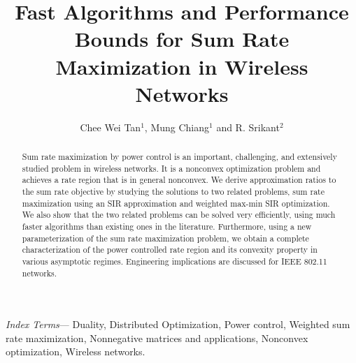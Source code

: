 \documentclass[10pt,twocolumn]{IEEEtran}
\newcommand{\0}{\mathbf{0}}
\newcommand{\1}{\mathbf{1}}
\begin{document}
\title{Fast Algorithms and Performance Bounds for Sum Rate Maximization in Wireless Networks}
\author{Chee Wei Tan$^1$, Mung Chiang$^1$ and R. Srikant$^2$\\
 }
\maketitle
\begin{abstract}
Sum rate maximization by power control is an important, challenging, and extensively studied problem in wireless networks. It is a nonconvex optimization problem and achieves a rate region that is in general nonconvex. We derive approximation ratios to the sum rate objective by studying the solutions to two related problems, sum rate maximization using an SIR approximation and weighted max-min SIR optimization. We also show that the two related problems can be solved very efficiently, using much faster algorithms than existing ones in the literature. Furthermore, using a new parameterization of the sum rate maximization problem, we obtain a complete characterization of the power controlled rate region and its convexity property in various asymptotic regimes. Engineering implications are discussed for IEEE 802.11 networks. 
\end{abstract}

{\small {\it Index Terms}--- Duality, Distributed Optimization, Power control, Weighted sum rate maximization, Nonnegative matrices and applications, Nonconvex optimization, Wireless networks.}
\end{document}
